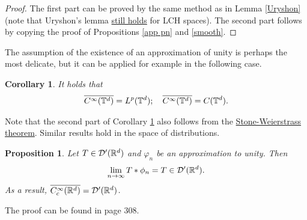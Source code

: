 \documentclass[12pt]{article}
\newtheorem{proposition}{Proposition}
\newtheorem{corollary}{Corollary}
\theoremstyle{remark}
\begin{document}
\begin{proof}
	The first part can be proved by the same method as in Lemma \ref{Uryshon} (note that Uryshon's lemma \href{https://planetmath.org/ApplicationsOfUrysohnsLemmaToLocallyCompactHausdorffSpaces}{still holds} for LCH spaces). The second part follows by copying the proof of Propositions \ref{app pn} and \ref{smooth}.
\end{proof}
The assumption of the existence of an approximation of unity is perhaps the most delicate, but it can be applied for example in the following case.
\begin{corollary}\label{Stone}
	It holds that
	\begin{align*}
		\overline{C^\infty(\mathbb{T}^d)}= L^p(\mathbb{T}^d); \quad \overline{C^\infty(\mathbb{T}^d)} = C(\mathbb{T}^d).
	\end{align*}
\end{corollary}
Note that the second part of Corollary \ref{Stone} also follows from the \href{https://en.wikipedia.org/wiki/Stone%E2%80%93Weierstrass_theorem}{Stone-Weierstrass theorem}.
Similar results hold in the space of distributions.    \begin{proposition}
	Let $T\in \mathcal{D}'(\mathbb{R}^d)$ and $\varphi_n$ be an approximation to unity. Then
	\begin{align*}
		\lim_{n \to \infty} T* \phi_n= T \in \mathcal{D}'(\mathbb{R}^d).
	\end{align*}
	As a result, $\overline{C_c^\infty(\mathbb{R}^d)}=\mathcal{D}'(\mathbb{R}^d)$.
\end{proposition}
The proof can be found in \cite{leoni2017first} page 308.
\end{document}
